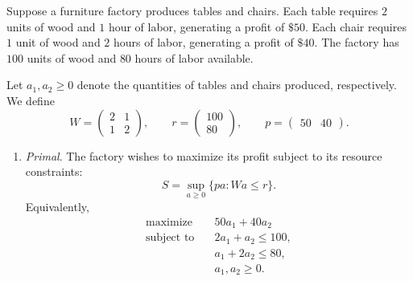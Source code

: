 	\begin{example}
	  \label{ex:production-planning-and-resource-pricing}
		Suppose a furniture factory produces tables and chairs. Each table requires $2$ units of wood and $1$ hour of labor, generating a profit of $\$50$. Each chair requires $1$ unit of wood and $2$ hours of labor, generating a profit of $\$40$. The factory has $100$ units of wood and $80$ hours of labor available.

		Let $a_1,a_2 \geq 0$ denote the quantities of tables and chairs produced, respectively. We define
		\begin{equation}
			W = \begin{pmatrix}
				2 & 1 \\
				1 & 2
			\end{pmatrix}, \qquad
			r = \begin{pmatrix}
				100 \\ 80
			\end{pmatrix}, \qquad
			p = \begin{pmatrix}
				50 & 40
			\end{pmatrix}.
		\end{equation}

		\begin{enumerate}
			\item \textit{Primal}. The factory wishes to maximize its profit subject to its resource constraints:
				\begin{equation}
					S = \sup_{a \geq 0}
					\{pa \colon Wa \leq r\}.
				\end{equation}
				Equivalently,
				\begin{align}
					\text{maximize} \quad &50a_1 + 40a_2 \\
					\text{subject to} \quad
					&2a_1 + a_2 \leq 100, \\
					&a_1 + 2a_2 \leq 80, \\
					&a_1,a_2 \geq 0.
				\end{align}


\end{enumerate}
\end{example}
